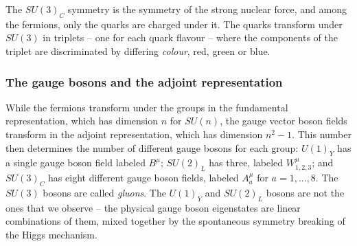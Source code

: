 \documentclass[twoside,english]{uiofysmaster}
\begin{document}
The $SU(3)_C$ symmetry is the symmetry of the strong nuclear force, and among the fermions, only the quarks are charged under it. The quarks transform under $SU(3)$ in triplets -- one for each quark flavour -- where the components of the triplet are discriminated by differing {\it colour}, red, green or blue. 

\subsubsection{The gauge bosons and the adjoint representation}

While the fermions transform under the groups in the fundamental representation, which has dimension $n$ for $SU(n)$, the gauge vector boson fields transform in the adjoint representation, which has dimension $n^2-1$. This number then determines the number of different gauge bosons for each group: $U(1)_Y$ has a single gauge boson field labeled $B^\mu$; $SU(2)_L$ has three, labeled $W^\mu_{1,2,3}$; and $SU(3)_C$ has eight different gauge boson fields, labeled $A^\mu_a$ for $a = 1,...,8$. The $SU(3)$ bosons are called {\it gluons}. The $U(1)_Y$ and $SU(2)_L$ bosons are not the ones that we observe -- the physical gauge boson eigenstates are linear combinations of them, mixed together by the spontaneous symmetry breaking of the Higgs mechanism.
\end{document}
